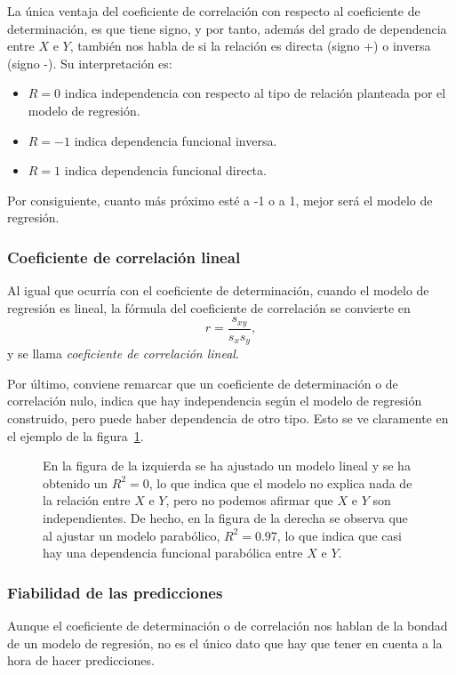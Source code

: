 La única ventaja del coeficiente de correlación con respecto al coeficiente de
determinación, es que tiene signo, y por tanto, además del grado de
dependencia entre $X$ e $Y$, también nos habla de si la relación es directa
(signo +) o inversa (signo -). Su interpretación es:
\begin{itemize}
\item $R=0$ indica independencia con respecto al tipo de relación planteada por el modelo de
regresión.
\item $R=-1$ indica dependencia funcional inversa.
\item $R=1$ indica dependencia funcional directa.
\end{itemize}
Por consiguiente, cuanto más próximo esté a -1 o a 1, mejor será el modelo de
regresión.

\subsubsection{Coeficiente de correlación lineal}
Al igual que ocurría con el coeficiente de determinación, cuando el modelo de
regresión es lineal, la fórmula del coeficiente de correlación se convierte en
\[
r=\frac{s_{xy}}{s_x s_y},
\]
y se llama \emph{coeficiente de correlación lineal}.

Por último, conviene remarcar que un coeficiente de determinación o de
correlación nulo, indica que hay independencia según el modelo de regresión
construido, pero puede haber dependencia de otro tipo. Esto se ve claramente en el ejemplo de  la figura~\ref{g:dependenciaparabolica}.

\begin{figure}[h!]
\centering {}\qquad
{}
\caption{En la figura de la izquierda se ha ajustado un modelo lineal y se ha obtenido un
$R^2=0$, lo que indica que el modelo no explica nada de la relación entre $X$ e
$Y$, pero no podemos afirmar que $X$ e $Y$ son independientes. De hecho, en la
figura de la derecha se observa que al ajustar un modelo parabólico, $R^2=0.97$,
lo que indica que casi hay una dependencia funcional parabólica entre $X$ e $Y$.}
\label{g:dependenciaparabolica}
\end{figure}

\subsubsection{Fiabilidad de las predicciones}
Aunque el coeficiente de determinación o de correlación nos hablan de la bondad de un modelo de regresión, no es el único dato que hay que tener en cuenta a la hora de hacer predicciones.

